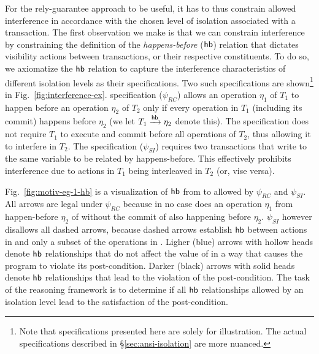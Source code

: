 For the rely-guarantee approach to be useful, it has to thus constrain
allowed interference in accordance with the chosen level of isolation
associated with a transaction. The first observation we make is that
we can constrain interference by constraining the definition of the
\emph{happens-before} ($\textsf{hb}$) relation that dictates visibility
actions between transactions, or their respective constituents.  To do
so, we axiomatize the $\textsf{hb}$ relation to capture the interference
characteristics of different isolation levels as their specifications.
Two such specifications are shown\footnote{Note that specifications
presented here are solely for illustration. The actual specifications
described in \S\ref{sec:ansi-isolation} are more nuanced.} in
Fig.~\ref{fig:interference-ex}.   specification
($\psi_{RC}$) allows an operation $\eta_1$ of $T_1$ to happen before
an operation $\eta_2$ of $T_2$ only if every operation in $T_1$
(including its commit) happens before $\eta_2$ (we let $T_1 \xrightarrow{\textsf{hb}}
\eta_2$ denote this). The specification does not require $T_1$ to
execute and commit before all operations of $T_2$, thus allowing it to
interfere in $T_2$. The  specification
($\psi_{SI}$) requires two transactions that write to the same
variable to be related by happens-before.  This effectively prohibits
interference due to actions in $T_1$ being interleaved in $T_2$ (or,
vise versa). 

Fig.~\ref{fig:motiv-eg-1-hb} is a visualization of $\textsf{hb}$ 
from  to  allowed by $\psi_{RC}$ and $\psi_{SI}$. All
arrows are legal under $\psi_{RC}$ because in no case does an operation
$\eta_1$ from  happen-before $\eta_2$ of  without the commit
of  also happening before $\eta_2$. $\psi_{SI}$ however disallows
all dashed arrows, because dashed arrows establish $\textsf{hb}$ between actions in 
and only a subset of the operations in . Ligher (blue) arrows with
hollow heads denote $\textsf{hb}$ relationships that do not affect the value
of  in a way that causes the program to violate its
post-condition.  Darker (black) arrows with solid heads denote $\textsf{hb}$
relationships that lead to the violation of the post-condition. The task of
the reasoning framework is to determine if all $\textsf{hb}$ relationships
allowed by an isolation level lead to the satisfaction of the
post-condition.


